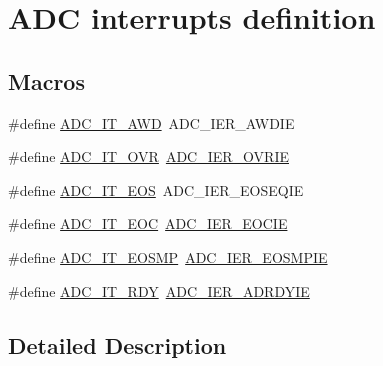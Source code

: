 \hypertarget{group___a_d_c__interrupts__definition}{}\section{A\+DC interrupts definition}
\label{group___a_d_c__interrupts__definition}
\subsection*{Macros}
\begin{DoxyCompactItemize}
\item 
\#define \hyperlink{group___a_d_c__interrupts__definition_ga2f5c7f9900c24250a0c6ccaa7cbca946}{A\+D\+C\+\_\+\+I\+T\+\_\+\+A\+WD}~A\+D\+C\+\_\+\+I\+E\+R\+\_\+\+A\+W\+D\+IE
\item 
\#define \hyperlink{group___a_d_c__interrupts__definition_gac3852b7789860e0ea79b82115ab877a0}{A\+D\+C\+\_\+\+I\+T\+\_\+\+O\+VR}~\hyperlink{group___peripheral___registers___bits___definition_ga150e154d48f6069e324aa642ec30f107}{A\+D\+C\+\_\+\+I\+E\+R\+\_\+\+O\+V\+R\+IE}
\item 
\#define \hyperlink{group___a_d_c__interrupts__definition_gaefebf69110054387451593d4d52ce197}{A\+D\+C\+\_\+\+I\+T\+\_\+\+E\+OS}~A\+D\+C\+\_\+\+I\+E\+R\+\_\+\+E\+O\+S\+E\+Q\+IE
\item 
\#define \hyperlink{group___a_d_c__interrupts__definition_ga0ad335d835f54415194d448019569e00}{A\+D\+C\+\_\+\+I\+T\+\_\+\+E\+OC}~\hyperlink{group___peripheral___registers___bits___definition_ga367429f3a07068668ffefd84c7c60985}{A\+D\+C\+\_\+\+I\+E\+R\+\_\+\+E\+O\+C\+IE}
\item 
\#define \hyperlink{group___a_d_c__interrupts__definition_ga955e4c06483055cade95fc849ff3af29}{A\+D\+C\+\_\+\+I\+T\+\_\+\+E\+O\+S\+MP}~\hyperlink{group___peripheral___registers___bits___definition_gafe38c621f1e8239fefbb8585911d2138}{A\+D\+C\+\_\+\+I\+E\+R\+\_\+\+E\+O\+S\+M\+P\+IE}
\item 
\#define \hyperlink{group___a_d_c__interrupts__definition_gad46aa18aeb55285ecda24956c9811936}{A\+D\+C\+\_\+\+I\+T\+\_\+\+R\+DY}~\hyperlink{group___peripheral___registers___bits___definition_ga55d9fb25dbbbaa72791a52fedfecca7b}{A\+D\+C\+\_\+\+I\+E\+R\+\_\+\+A\+D\+R\+D\+Y\+IE}
\end{DoxyCompactItemize}


\subsection{Detailed Description}


